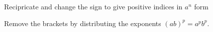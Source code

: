 \documentclass[12pt, a4paper, addpoints]{exam}
\newcommand{\ts}{\vspace{16mm}}
\begin{document}
\begin{questions}
\begin{multicols}{6}
\begin{parts}
\end{parts}
\end{multicols}
\ts



\question Recipricate  and change the sign to give positive indices in $a^n$ form

\setlength{\columnsep}{20pt}
\begin{multicols}{6}
\end{multicols}
\ts


\newpage
\question Remove the brackets by distributing the exponents  \((ab)^p = a^p b^p\).

\setlength{\columnsep}{20pt}
\begin{multicols}{5}
\end{multicols}
\end{questions}
\end{document}
